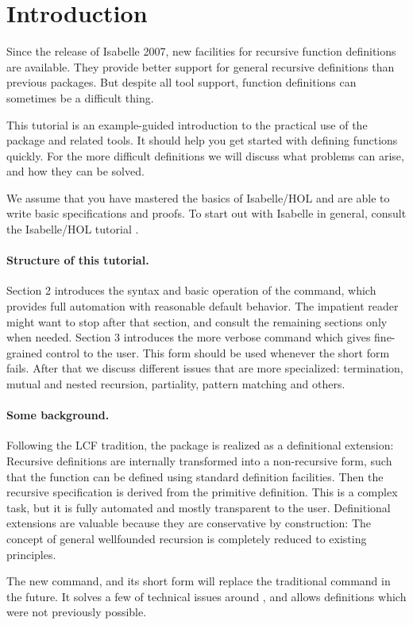 \section{Introduction}

Since the release of Isabelle 2007, new facilities for recursive
function definitions~\cite{krauss2006} are available. They provide
better support for general recursive definitions than previous
packages.  But despite all tool support, function definitions can
sometimes be a difficult thing. 

This tutorial is an example-guided introduction to the practical use
of the package and related tools. It should help you get started with
defining functions quickly. For the more difficult definitions we will
discuss what problems can arise, and how they can be solved.

We assume that you have mastered the basics of Isabelle/HOL
and are able to write basic specifications and proofs. To start out
with Isabelle in general, consult the Isabelle/HOL tutorial
\cite{isa-tutorial}.



\paragraph{Structure of this tutorial.}
Section 2 introduces the syntax and basic operation of the 
command, which provides full automation with reasonable default
behavior.  The impatient reader might want to stop after that
section, and consult the remaining sections only when needed.
Section 3 introduces the more verbose  command which
gives fine-grained control to the user. This form should be used
whenever the short form fails.
After that we discuss different issues that are more specialized:
termination, mutual and nested recursion, partiality, pattern matching
and others.


\paragraph{Some background.}
Following the LCF tradition, the package is realized as a definitional
extension: Recursive definitions are internally transformed into a
non-recursive form, such that the function can be defined using
standard definition facilities. Then the recursive specification is
derived from the primitive definition.  This is a complex task, but it
is fully automated and mostly transparent to the user. Definitional
extensions are valuable because they are conservative by construction:
The  concept of general wellfounded recursion is completely reduced
to existing principles.




The new  command, and its short form  will
replace the traditional  command \cite{slind-tfl} in the future. It solves
a few of technical issues around , and allows definitions
which were not previously possible.




